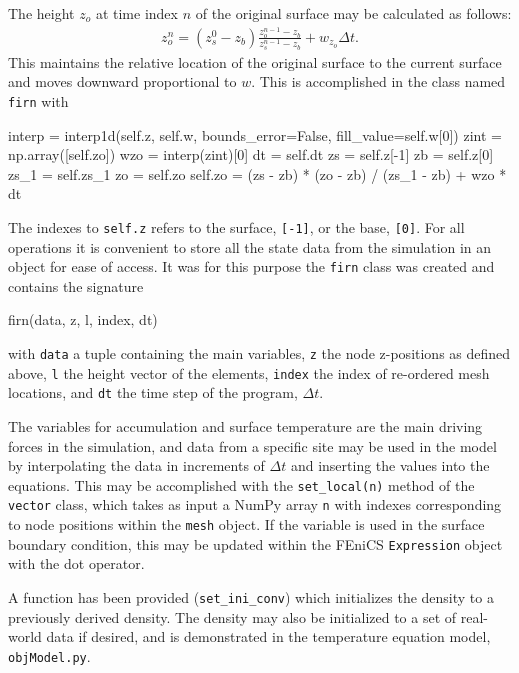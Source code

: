 The height $z_o$ at time index $n$ of the original surface may be calculated as follows:
\begin{align*}
  z_o^{n} = (z_s^0 - z_b) \frac{z_o^{n-1} - z_b}{z_s^{n-1} - z_b}
           + w_{z_o} \Delta t.
\end{align*}
This maintains the relative location of the original surface to the current surface and moves downward proportional to $w$.  This is accomplished in the class named \texttt{firn} with\par
\begin{python}
interp  = interp1d(self.z, self.w,
                   bounds_error=False,
                   fill_value=self.w[0])
zint    = np.array([self.zo])
wzo     = interp(zint)[0]
dt      = self.dt
zs      = self.z[-1]
zb      = self.z[0]
zs_1    = self.zs_1
zo      = self.zo
self.zo = (zs - zb) * (zo - zb) / (zs_1 - zb) 
          + wzo * dt
\end{python}
The indexes to \texttt{self.z} refers to the surface, \texttt{[-1]}, or the base, \texttt{[0]}.  For all operations it is convenient to store all the state data from the simulation in an object for ease of access.  It was for this purpose the \texttt{firn} class was created and contains the signature\par 
\begin{python}
firn(data, z, l, index, dt)
\end{python}
with \texttt{data} a tuple containing the main variables, \texttt{z} the node z-positions as defined above, \texttt{l} the height vector of the elements, \texttt{index} the index of re-ordered mesh locations, and \texttt{dt} the time step of the program, $\Delta t$.

The variables for accumulation and surface temperature are the main driving forces in the simulation, and data from a specific site may be used in the model by interpolating the data in increments of $\Delta t$ and inserting the values into the equations.  This may be accomplished with the \texttt{set\_local(n)} method of the \texttt{vector} class, which takes as input a NumPy array \texttt{n} with indexes corresponding to node positions within the \texttt{mesh} object.  If the variable is used in the surface boundary condition, this may be updated within the FEniCS \texttt{Expression} object with the dot operator.

A function has been provided (\texttt{set\_ini\_conv}) which initializes the density to a previously derived density.  The density may also be initialized to a set of real-world data if desired, and is demonstrated in the temperature equation model, \texttt{objModel.py}.

